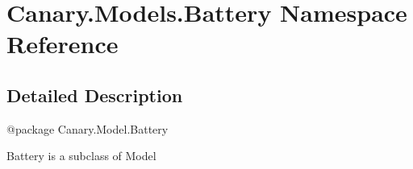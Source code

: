 \hypertarget{namespace_canary_1_1_models_1_1_battery}{\section{Canary.\-Models.\-Battery Namespace Reference}
\label{namespace_canary_1_1_models_1_1_battery}
}


\subsection{Detailed Description}
\begin{DoxyVerb}@package Canary.Model.Battery

Battery is a subclass of Model
\end{DoxyVerb}
 